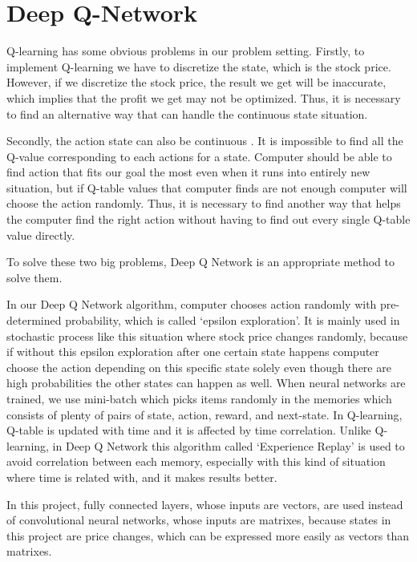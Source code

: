 \section{Deep Q-Network}

Q-learning has some obvious problems in our problem setting.
Firstly, to implement Q-learning we have to discretize the state, which is the stock price. However, if we discretize the stock price, the result we get will be inaccurate, which implies that the profit we get may not be optimized. Thus, it is necessary to find an alternative way that can handle the continuous state situation.

Secondly, the action state can also be continuous . It is impossible to find all the Q-value corresponding to each actions for a state. Computer should be able to find action that fits our goal the most even when it runs into entirely new situation, but if Q-table values that computer finds are not enough computer will choose the action randomly. Thus, it is necessary to find another way that helps the computer find the right action without having to find out every single Q-table value directly.

To solve these two big problems, Deep Q Network is an appropriate method to solve them.

In our Deep Q Network algorithm, computer chooses action randomly with pre-determined probability, which is called ‘epsilon exploration’. It is mainly used in stochastic process like this situation where stock price changes randomly, because if without this epsilon exploration after one certain state happens computer choose the action depending on this specific state solely even though there are high probabilities the other states can happen as well. 
When neural networks are trained, we use mini-batch which picks items randomly in the memories which consists of plenty of pairs of state, action, reward, and next-state. In Q-learning, Q-table is updated with time and it is affected by time correlation. Unlike Q-learning, in Deep Q Network this algorithm called ‘Experience Replay’ is used to avoid correlation between each memory, especially with this kind of situation where time is related with, and it makes results better.     

In this project, fully connected layers, whose inputs are vectors, are used instead of convolutional neural networks, whose inputs are matrixes, because states in this project are price changes, which can be expressed more easily as vectors than matrixes. 

